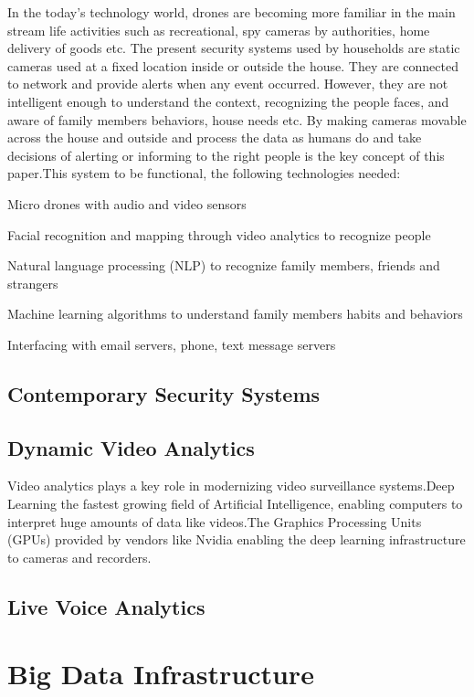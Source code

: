 \documentclass[sigconf]{acmart}
\begin{document}
In the today's technology world, drones are becoming more familiar in the main stream life activities such as recreational, spy cameras by authorities, home delivery of goods etc.
The present security systems used by households are static cameras used at a fixed location inside or outside the house. They are connected to network and provide alerts when any event occurred. However, they are not intelligent enough to understand the context, recognizing the people faces, and aware of family members behaviors, house needs etc.  By making cameras movable across the house and outside and process the data as humans do and take decisions of alerting or informing to the right people is the key concept of this paper.This system to be functional, the following technologies needed:

Micro drones with audio and video sensors\cite{Labs2016}

Facial recognition and mapping through video analytics to recognize people
	
Natural language processing (NLP) to recognize family members, friends and strangers

Machine learning algorithms to understand family members habits and behaviors

Interfacing with email servers, phone, text message servers

\subsection{Contemporary Security Systems}

\subsection{Dynamic Video Analytics}

Video analytics plays a key role in modernizing video surveillance systems.Deep Learning the fastest growing field of Artificial Intelligence, enabling computers to interpret huge 
amounts of data like videos.The Graphics Processing Units (GPUs) provided 
by vendors like Nvidia enabling the deep learning infrastructure to cameras and recorders. 

\subsection{Live Voice Analytics}

\section{Big Data Infrastructure}
\end{document}
